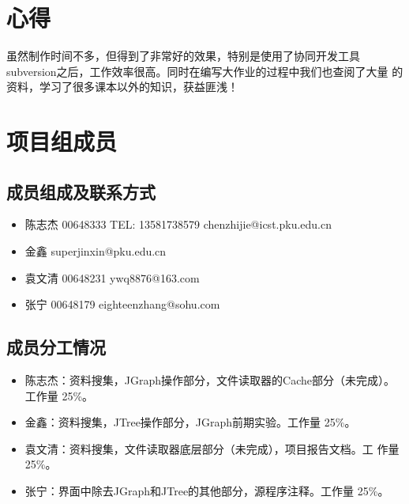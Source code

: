 \documentclass[a4paper,unicode=true,xetex]{article}
\begin{document}
\section{心得}

虽然制作时间不多，但得到了非常好的效果，特别是使用了协同开发工具%
subversion之后，工作效率很高。同时在编写大作业的过程中我们也查阅了大量%
的资料，学习了很多课本以外的知识，获益匪浅！


\section{项目组成员}

\subsection{成员组成及联系方式}
\begin{itemize}
\item 陈志杰 00648333 TEL: 13581738579  chenzhijie@icst.pku.edu.cn
\item 金鑫 superjinxin@pku.edu.cn
\item 袁文清 00648231 ywq8876@163.com
\item 张宁 00648179 eighteenzhang@sohu.com
\end{itemize}

\subsection{成员分工情况}

\begin{itemize}
\item 陈志杰：资料搜集，JGraph操作部分，文件读取器的Cache部分（未完成）。
  工作量 25\%。
\item 金鑫：资料搜集，JTree操作部分，JGraph前期实验。工作量 25\%。
\item 袁文清：资料搜集，文件读取器底层部分（未完成），项目报告文档。工
  作量 25\%。
\item 张宁：界面中除去JGraph和JTree的其他部分，源程序注释。工作量 25\%。
\end{itemize}
\end{document}
